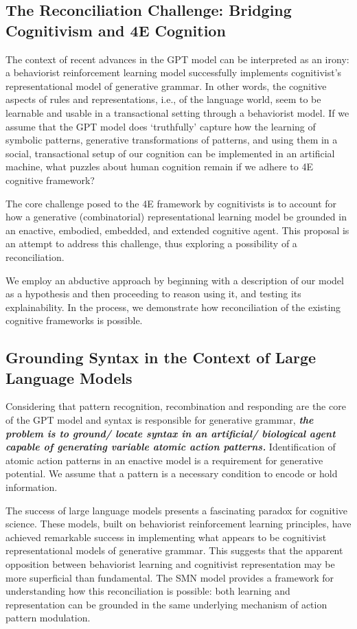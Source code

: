 \subsection{The Reconciliation Challenge: Bridging Cognitivism and 4E Cognition}
The context of recent advances in the GPT model can be interpreted as an irony: a behaviorist reinforcement learning model successfully implements cognitivist's representational model of generative grammar. In other words, the cognitive aspects of rules and representations, i.e., of the language world, seem to be learnable and usable in a transactional setting through a behaviorist model. If we assume that the GPT model does `truthfully' capture how the learning of symbolic patterns, generative transformations of patterns, and using them in a social, transactional setup of our cognition can be implemented in an artificial machine, what puzzles about human cognition remain if we adhere to 4E cognitive framework? 

The core challenge posed to the 4E framework by cognitivists is to account for how a generative (combinatorial) representational learning model be grounded in an enactive, embodied, embedded, and extended cognitive agent. This proposal is an attempt to address this challenge, thus exploring a possibility of a reconciliation.

We employ an abductive approach by beginning with a description of our model as a hypothesis and then proceeding to reason using it, and testing its explainability. In the process, we demonstrate how reconciliation of the existing cognitive frameworks is possible.

\subsection{Grounding Syntax in the Context of Large Language Models}
Considering that pattern recognition, recombination and responding are the core of the GPT model and syntax is responsible for generative grammar, \textbf{\textit{the problem is to ground/ locate syntax in an artificial/ biological agent capable of generating variable atomic action patterns.}} Identification of atomic action patterns in an enactive model is a requirement for generative potential. We assume that a pattern is a necessary condition to encode or hold information.

The success of large language models presents a fascinating paradox for cognitive science. These models, built on behaviorist reinforcement learning principles, have achieved remarkable success in implementing what appears to be cognitivist representational models of generative grammar. This suggests that the apparent opposition between behaviorist learning and cognitivist representation may be more superficial than fundamental. The SMN model provides a framework for understanding how this reconciliation is possible: both learning and representation can be grounded in the same underlying mechanism of action pattern modulation. 

